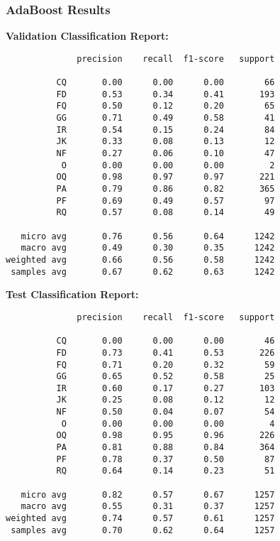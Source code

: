 \documentclass{article}
\begin{document}
\subsubsection{AdaBoost Results}
\textbf{Validation Classification Report:}
\begin{verbatim}
              precision    recall  f1-score   support

          CQ       0.00      0.00      0.00        66
          FD       0.53      0.34      0.41       193
          FQ       0.50      0.12      0.20        65
          GG       0.71      0.49      0.58        41
          IR       0.54      0.15      0.24        84
          JK       0.33      0.08      0.13        12
          NF       0.27      0.06      0.10        47
           O       0.00      0.00      0.00         2
          OQ       0.98      0.97      0.97       221
          PA       0.79      0.86      0.82       365
          PF       0.69      0.49      0.57        97
          RQ       0.57      0.08      0.14        49

   micro avg       0.76      0.56      0.64      1242
   macro avg       0.49      0.30      0.35      1242
weighted avg       0.66      0.56      0.58      1242
 samples avg       0.67      0.62      0.63      1242
\end{verbatim}
\textbf{Test Classification Report:}
\begin{verbatim}
              precision    recall  f1-score   support

          CQ       0.00      0.00      0.00        46
          FD       0.73      0.41      0.53       226
          FQ       0.71      0.20      0.32        59
          GG       0.65      0.52      0.58        25
          IR       0.60      0.17      0.27       103
          JK       0.25      0.08      0.12        12
          NF       0.50      0.04      0.07        54
           O       0.00      0.00      0.00         4
          OQ       0.98      0.95      0.96       226
          PA       0.81      0.88      0.84       364
          PF       0.78      0.37      0.50        87
          RQ       0.64      0.14      0.23        51

   micro avg       0.82      0.57      0.67      1257
   macro avg       0.55      0.31      0.37      1257
weighted avg       0.74      0.57      0.61      1257
 samples avg       0.70      0.62      0.64      1257
\end{verbatim}
\end{document}
